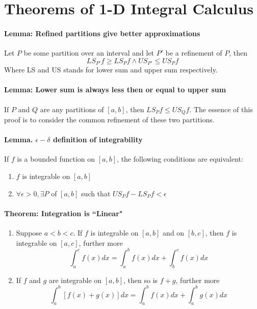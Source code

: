\documentclass[11pt]{article}
\begin{document}
\section{Theorems of 1-D Integral Calculus}
\paragraph{Lemma: Refined partitions give better approximations} Let $P$ be some partition over an interval and let $P'$ be a refinement of $P$, then
\begin{equation*}
    LS_{P'}f \geq LS_{P}f \wedge US_{P'} \leq US_{P}f
\end{equation*}
Where LS and US stands for lower sum and upper sum respectively.

\paragraph{Lemma: Lower sum is always less then or equal to upper sum} If $P$ and $Q$ are any partitions of $[a,b]$, then $LS_Pf \leq US_Qf$. The essence of this proof is to consider the common refinement of these two partitions.

\paragraph{Lemma. $\epsilon-\delta$ definition of integrability} If $f$ is a bounded function on $[a,b]$, the following conditions are equivalent:
\begin{enumerate}
    \item $f$ is integrable on $[a,b]$
    \item $\forall \epsilon > 0, \exists P$ of $[a,b]$ such that $US_Pf - LS_Pf < \epsilon$
\end{enumerate}

\paragraph{Theorem:  Integration is ``Linear"}
\begin{enumerate}
    \item Suppose $a < b<c$. If $f$ is integrable on $[a,b]$ and on $[b,c]$, then $f$ is integrable on $[a,c]$, further more
    \begin{equation*}
        \int_a^c f(x)dx = \int_a^b f(x)dx + \int_b^c f(x)dx
    \end{equation*}
    \item If $f$ and $g$ are integrable on $[a,b]$, then so is $f+g$, further more
    \begin{equation*}
        \int_a^b [f(x) + g(x)]dx = \int_a^b f(x)dx + \int_a^b g(x)dx
    \end{equation*}
\end{enumerate}
\end{document}
